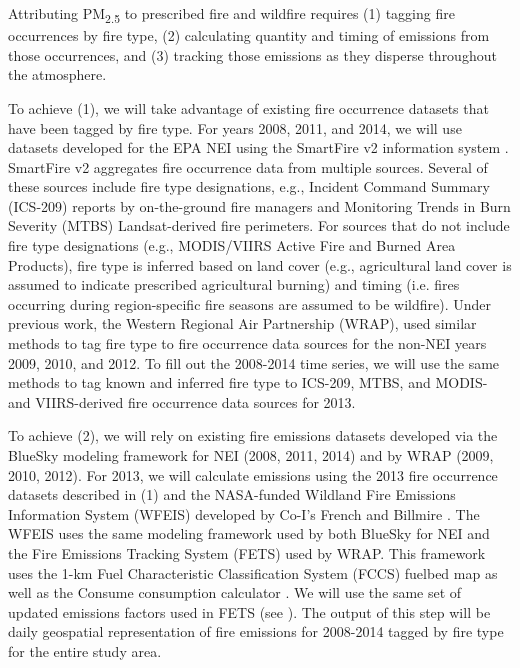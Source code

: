 \documentclass[authoryear]{elsarticle}
\begin{document}
	Attributing PM\textsubscript{2.5} to prescribed fire and wildfire 
requires (1) tagging fire occurrences by fire type, (2) calculating quantity and timing of emissions from those occurrences, and (3) tracking those emissions as they disperse throughout the atmosphere.

To achieve (1), we will take advantage of existing fire occurrence datasets that have been tagged by fire type. For years 2008, 2011, and 2014, we will use datasets developed for the EPA NEI using the SmartFire v2 information system \citep{SmartFire2017,Raffuse2009}. SmartFire v2 aggregates fire occurrence data from multiple sources. Several of these sources include fire type designations, e.g., Incident Command Summary (ICS-209) reports by on-the-ground fire managers and Monitoring Trends in Burn Severity (MTBS) \citep{ICS2017,Eidenshink2007} Landsat-derived fire perimeters. For sources that do not include fire type designations (e.g., MODIS/VIIRS Active Fire and Burned Area Products), fire type is inferred based on land cover (e.g., agricultural land cover is assumed to indicate prescribed agricultural burning) and timing (i.e. fires occurring during region-specific fire seasons are assumed to be wildfire).  Under previous work, the Western Regional Air Partnership (WRAP), used similar methods to tag fire type to fire occurrence data sources for the non-NEI years 2009, 2010, and 2012. To fill out the 2008-2014 time series, we will use the same methods to tag known and inferred fire type to ICS-209, MTBS, and MODIS- and VIIRS-derived fire occurrence data sources for 2013.

To achieve (2), we will rely on existing fire emissions datasets developed via the BlueSky \citep{BlueSky2017} modeling framework for NEI (2008, 2011, 2014) and by WRAP (2009, 2010, 2012). For 2013, we will calculate emissions using the 2013 fire occurrence datasets described in (1) and the NASA-funded Wildland Fire Emissions Information System (WFEIS) \citep{WFEIS2017} developed by Co-I's French and Billmire \citep{French2014}. The WFEIS uses the same modeling framework used by both BlueSky for NEI and the Fire Emissions Tracking System (FETS) \citep{FETS2017} used by WRAP. This framework uses the 1-km Fuel Characteristic Classification System (FCCS) \citep{Ottmar2007} fuelbed map as well as the Consume consumption calculator \citep{Prichard2009}. We will use the same set of updated emissions factors used in FETS (see \cite{PMDETAIL2017}). The output of this step will be daily geospatial representation of fire emissions for 2008-2014 tagged by fire type for the entire study area.
\end{document}
